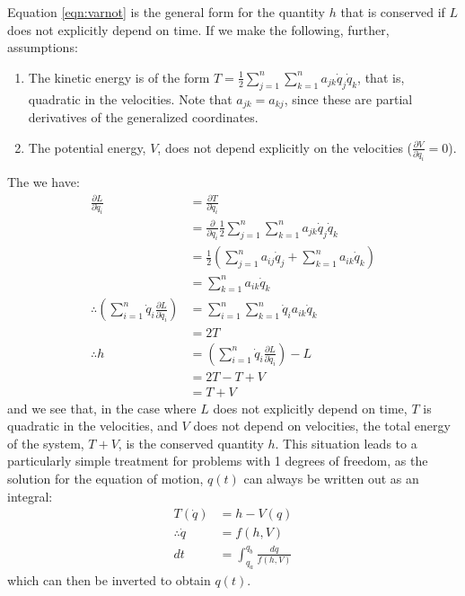 Equation \ref{eqn:varnot} is the general form for the quantity $h$ that is conserved if $L$ does not explicitly depend on time. If we make the following, further, assumptions:
\begin{enumerate}
\item The kinetic energy is of the form $T=\frac{1}{2}\sum_{j=1}^n\sum_{k=1}^na_{jk}\dot{q}_j\dot{q}_k$, that is, quadratic in the velocities. Note that $a_{jk}=a_{kj}$, since these are partial derivatives of the generalized coordinates.
\item The potential energy, $V$, does not depend explicitly on the velocities ($\frac{\partial V}{\partial\dot{q}_i}=0$).
\end{enumerate}
The we have:
\begin{align}
\frac{\partial L}{\partial\dot{q}_i}&=\frac{\partial T}{\partial\dot{q}_i}\nonumber\\
&=\frac{\partial }{\partial\dot{q}_i}\frac{1}{2}\sum_{j=1}^n\sum_{k=1}^na_{jk}\dot{q}_j\dot{q}_k\nonumber\\
&=\frac{1}{2}\left(\sum_{j=1}^n a_{ij}\dot{q}_j+\sum_{k=1}^n a_{ik}\dot{q}_k\right)\nonumber\\
&=\sum_{k=1}^na_{ik}\dot{q}_k\nonumber\\
\therefore \left(\sum_{i=1}^n \dot{q}_i\frac{\partial L}{\partial \dot{q}_i}\right) &= \sum_{i=1}^n\sum_{k=1}^n\dot{q}_ia_{ik}\dot{q}_k\nonumber\\
&=2T\nonumber\\
\therefore h&=\left(\sum_{i=1}^n \dot{q}_i\frac{\partial L}{\partial \dot{q}_i}\right)-L\nonumber\\
&=2T - T +V\nonumber\\
&=T+V
\end{align}
and we see that, in the case where $L$ does not explicitly depend on time, $T$ is quadratic in the velocities, and $V$ does not depend on velocities, the total energy of the system, $T+V$, is the conserved quantity $h$. This situation leads to a particularly simple treatment for problems with 1 degrees of freedom, as the solution for the equation of motion, $q(t)$ can always be written out as an integral:
\begin{align}
T(\dot{q})&=h-V(q)\nonumber\\
\therefore \dot{q}&=f(h,V)\nonumber\\
dt &=\int_{q_a}^{q_b}\frac{dq}{f(h,V)}
\label{eqn:econs1d}
\end{align} 
which can then be inverted to obtain $q(t)$.
